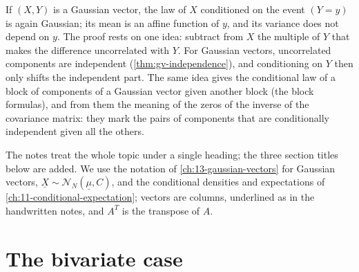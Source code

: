 
If $(X,Y)$ is a Gaussian vector, the law of $X$ conditioned on the event $(Y=y)$ is again Gaussian;
its mean is an affine function of $y$, and its variance does not depend on $y$. The proof rests on
one idea: subtract from $X$ the multiple of $Y$ that makes the difference uncorrelated with $Y$. For
Gaussian vectors, uncorrelated components are independent (\cref{thm:gv-independence}), and
conditioning on $Y$ then only shifts the independent part. The same idea gives the conditional law
of a block of components of a Gaussian vector given another block (the block formulas), and from
them the meaning of the zeros of the inverse of the covariance matrix: they mark the pairs of
components that are conditionally independent given all the others.

The notes treat the whole topic under a single heading; the three section titles below are
added. We use the notation of \cref{ch:13-gaussian-vectors} for Gaussian vectors,
$\underline X\sim\mathcal N_N(\underline\mu,C)$, and the conditional densities and expectations of
\cref{ch:11-conditional-expectation}; vectors are columns, underlined as in the handwritten notes, and
$A^T$ is the transpose of $A$.

\section{The bivariate case}\label{sec:gc-bivariate}

